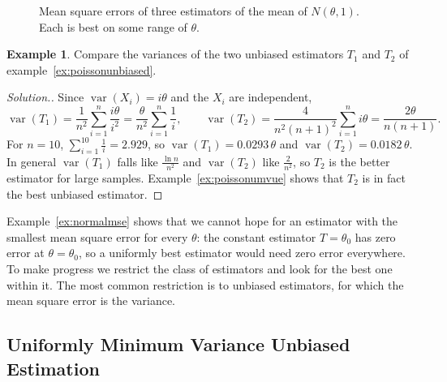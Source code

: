\documentclass[12pt,a4paper]{report}
\theoremstyle{definition}
\newtheorem{exa}[thm]{Example}
\DeclareMathOperator{\var}{var}
\newenvironment{solution}
  {\renewcommand{\qedsymbol}{}\begin{proof}[\textit{Solution}.]}
  {\end{proof}}
\begin{document}
\begin{figure}[H]
\centering
{}
\caption{Mean square errors of three estimators of the mean of $N(\theta, 1)$.
Each is best on some range of $\theta$.}
\label{fig:msecurves}
\end{figure}

\begin{exa}
\label{ex:poissoncompare}
Compare the variances of the two unbiased estimators $T_1$ and $T_2$ of
example~\ref{ex:poissonunbiased}.
\end{exa}

\begin{solution}
Since $\var(X_i) = i\theta$ and the $X_i$ are independent,
\[\var(T_1) = \frac{1}{n^2}\sum_{i=1}^n\frac{i\theta}{i^2} = \frac{\theta}{n^2}\sum_{i=1}^n\frac1i,
\qquad
\var(T_2) = \frac{4}{n^2(n + 1)^2}\sum_{i=1}^n i\theta = \frac{2\theta}{n(n + 1)} .\]
For $n = 10$, $\sum_{i=1}^{10}\frac1i = 2.929$, so $\var(T_1) = 0.0293\,\theta$
and $\var(T_2) = 0.0182\,\theta$. In general $\var(T_1)$ falls like
$\frac{\ln n}{n^2}$ and $\var(T_2)$ like $\frac{2}{n^2}$, so $T_2$ is the better
estimator for large samples. Example~\ref{ex:poissonumvue} shows that $T_2$ is in
fact the best unbiased estimator.
\end{solution}

Example~\ref{ex:normalmse} shows that we cannot hope for an estimator with the
smallest mean square error for every $\theta$: the constant estimator $T = \theta_0$
has zero error at $\theta = \theta_0$, so a uniformly best estimator would need
zero error everywhere. To make progress we restrict the class of estimators and
look for the best one within it. The most common restriction is to unbiased
estimators, for which the mean square error is the variance.

\subsection{Uniformly Minimum Variance Unbiased Estimation}
\end{document}
